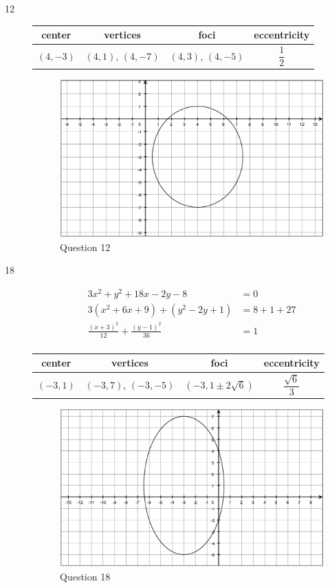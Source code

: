 \documentclass[fleqn,addpoints]{exam}
\begin{document}
\begin{description}
\item[12]
\begin{tabular}{cccc}
\toprule
center & vertices & foci & eccentricity \\
\midrule
  $(4, -3)$ & $(4, 1)$, $(4, -7)$ & $(4, 3)$, $(4, -5)$ & $\dfrac{1}{2}$ \\
\bottomrule
\end{tabular}

\begin{figure}[H]
  \centering
  \includegraphics[scale=.3]{p792_12.eps}
  \caption*{Question 12}
\end{figure}

\item[18]
\begin{align*}
  3x^2 + y^2 + 18x - 2y - 8 &= 0 \\
  3(x^2 + 6x + 9) + (y^2 - 2y + 1) &= 8 + 1 + 27 \\
  \frac{(x+3)^2}{12} + \frac{(y-1)^2}{36} &= 1 \\
\end{align*}

\begin{tabular}{cccc}
\toprule
center & vertices & foci & eccentricity \\
\midrule
  $(-3, 1)$ & $(-3, 7)$, $(-3, -5)$ & $(-3, 1 \pm 2\sqrt{6})$ & $\dfrac{\sqrt{6}}{3}$ \\
\bottomrule
\end{tabular}

\begin{figure}[H]
  \centering
  \includegraphics[scale=.3]{p792_18.eps}
  \caption*{Question 18}
\end{figure}


\end{description}
\end{document}

